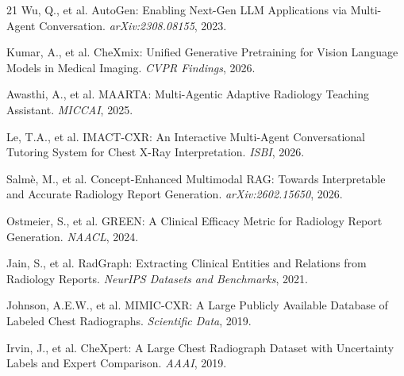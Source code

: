 \documentclass[runningheads,10pt]{llncs}
\begin{document}
\begin{thebibliography}{21}
 Wu, Q., et al. AutoGen: Enabling Next-Gen LLM Applications via Multi-Agent Conversation. \emph{arXiv:2308.08155}, 2023.

 Kumar, A., et al. CheXmix: Unified Generative Pretraining for Vision Language Models in Medical Imaging. \emph{CVPR Findings}, 2026.

 Awasthi, A., et al. MAARTA: Multi-Agentic Adaptive Radiology Teaching Assistant. \emph{MICCAI}, 2025.

 Le, T.A., et al. IMACT-CXR: An Interactive Multi-Agent Conversational Tutoring System for Chest X-Ray Interpretation. \emph{ISBI}, 2026.

 Salm\`{e}, M., et al. Concept-Enhanced Multimodal RAG: Towards Interpretable and Accurate Radiology Report Generation. \emph{arXiv:2602.15650}, 2026.

 Ostmeier, S., et al. GREEN: A Clinical Efficacy Metric for Radiology Report Generation. \emph{NAACL}, 2024.

 Jain, S., et al. RadGraph: Extracting Clinical Entities and Relations from Radiology Reports. \emph{NeurIPS Datasets and Benchmarks}, 2021.

 Johnson, A.E.W., et al. MIMIC-CXR: A Large Publicly Available Database of Labeled Chest Radiographs. \emph{Scientific Data}, 2019.

 Irvin, J., et al. CheXpert: A Large Chest Radiograph Dataset with Uncertainty Labels and Expert Comparison. \emph{AAAI}, 2019.

\end{thebibliography}
\end{document}
